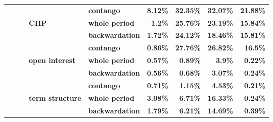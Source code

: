 \documentclass[
  authoryear,
  preprint,
  3p]{elsarticle}
\begin{document}
\begin{longtable}[t]{>{}l>{}l>{}l>{}l>{}l>{}r>{}r>{}r>{}r}
\textbf{} & \textbf{} & \textbf{} & \textbf{} & \textbf{contango} & \textcolor[HTML]{4285f4}{\textbf{8.12\%}} & \textcolor[HTML]{4285f4}{\textbf{32.35\%}} & \textcolor[HTML]{4285f4}{\textbf{32.07\%}} & \textcolor[HTML]{4285f4}{\textbf{21.88\%}}\\
\addlinespace
\textbf{} & \textbf{} & \textbf{} & \textbf{CHP} & \textbf{whole period} & \textcolor[HTML]{4285f4}{\textbf{1.2\%}} & \textcolor[HTML]{4285f4}{\textbf{25.76\%}} & \textcolor[HTML]{4285f4}{\textbf{23.19\%}} & \textcolor[HTML]{4285f4}{\textbf{15.84\%}}\\
\textbf{} & \textbf{} & \textbf{} & \textbf{} & \textbf{backwardation} & \textcolor[HTML]{4285f4}{\textbf{1.72\%}} & \textcolor[HTML]{4285f4}{\textbf{24.12\%}} & \textcolor[HTML]{4285f4}{\textbf{18.46\%}} & \textcolor[HTML]{4285f4}{\textbf{15.81\%}}\\
\textbf{} & \textbf{} & \textbf{} & \textbf{} & \textbf{contango} & \textcolor[HTML]{4285f4}{\textbf{0.86\%}} & \textcolor[HTML]{4285f4}{\textbf{27.76\%}} & \textcolor[HTML]{4285f4}{\textbf{26.82\%}} & \textcolor[HTML]{4285f4}{\textbf{16.5\%}}\\
\textbf{} & \textbf{} & \textbf{} & \textbf{open interest} & \textbf{whole period} & \textcolor[HTML]{4285f4}{\textbf{0.57\%}} & \textcolor[HTML]{4285f4}{\textbf{0.89\%}} & \textcolor[HTML]{4285f4}{\textbf{3.9\%}} & \textcolor[HTML]{4285f4}{\textbf{0.22\%}}\\
\textbf{} & \textbf{} & \textbf{} & \textbf{} & \textbf{backwardation} & \textcolor[HTML]{4285f4}{\textbf{0.56\%}} & \textcolor[HTML]{4285f4}{\textbf{0.68\%}} & \textcolor[HTML]{4285f4}{\textbf{3.07\%}} & \textcolor[HTML]{4285f4}{\textbf{0.24\%}}\\
\addlinespace
\textbf{} & \textbf{} & \textbf{} & \textbf{} & \textbf{contango} & \textcolor[HTML]{4285f4}{\textbf{0.71\%}} & \textcolor[HTML]{4285f4}{\textbf{1.15\%}} & \textcolor[HTML]{4285f4}{\textbf{4.53\%}} & \textcolor[HTML]{4285f4}{\textbf{0.21\%}}\\
\textbf{} & \textbf{} & \textbf{} & \textbf{term structure} & \textbf{whole period} & \textcolor[HTML]{4285f4}{\textbf{3.08\%}} & \textcolor[HTML]{4285f4}{\textbf{6.71\%}} & \textcolor[HTML]{4285f4}{\textbf{16.33\%}} & \textcolor[HTML]{4285f4}{\textbf{0.24\%}}\\
\textbf{} & \textbf{} & \textbf{} & \textbf{} & \textbf{backwardation} & \textcolor[HTML]{4285f4}{\textbf{1.79\%}} & \textcolor[HTML]{4285f4}{\textbf{6.21\%}} & \textcolor[HTML]{4285f4}{\textbf{14.69\%}} & \textcolor[HTML]{4285f4}{\textbf{0.39\%}}\\

\end{longtable}
\end{document}
